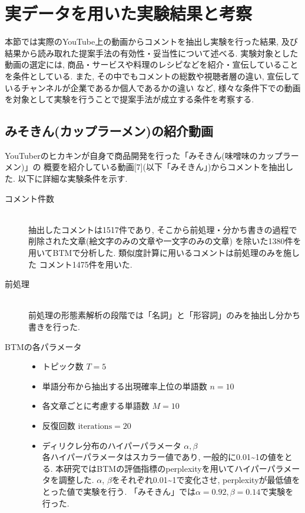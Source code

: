 \documentclass{ltjarticle}
\begin{document}
\section
{実データを用いた実験結果と考察}
本節では実際のYouTube上の動画からコメントを抽出し実験を行った結果, 及び結果から読み取れた提案手法の有効性・妥当性について述べる. 
実験対象とした動画の選定には, 商品・サービスや料理のレシピなどを紹介・宣伝していることを条件としている. 
また, その中でもコメントの総数や視聴者層の違い, 宣伝しているチャンネルが企業であるか個人であるかの違い
など, 様々な条件下での動画を対象として実験を行うことで提案手法が成立する条件を考察する. 
\subsection{みそきん(カップラーメン)の紹介動画}
YouTuberのヒカキンが自身で商品開発を行った「みそきん(味噌味のカップラーメン)」の
概要を紹介している動画[7](以下「みそきん」)からコメントを抽出した. 
以下に詳細な実験条件を示す. 
\begin{description}
    \item[コメント件数]\mbox{}\\
    抽出したコメントは1517件であり, そこから前処理・分かち書きの過程で削除された文章(絵文字のみの文章や一文字のみの文章)
    を除いた1380件を用いてBTMで分析した. 類似度計算に用いるコメントは前処理のみを施した
    コメント1475件を用いた. 
    \item[前処理] \mbox{}\\
    前処理の形態素解析の段階では「名詞」と「形容詞」のみを抽出し分かち書きを行った. 
    \item[BTMの各パラメータ]\mbox{}
    \begin{itemize}
        \item トピック数 $T=5$
        \item 単語分布から抽出する出現確率上位の単語数 $n = 10$
        \item 各文章ごとに考慮する単語数 $M=10$
        \item 反復回数 $\textrm{iterations} = 20$
        \item ディリクレ分布のハイパーパラメータ $\alpha, \beta$\\
        各ハイパーパラメータはスカラー値であり, 一般的に0.01\sim1の値をとる. 
        本研究ではBTMの評価指標のperplexityを用いてハイパーパラメータを調整した. 
        $\alpha$, $\beta$をそれぞれ0.01\sim1で変化させ, perplexityが最低値をとった値で実験を行う. 
        「みそきん」では$\alpha = 0.92, \beta = 0.14$で実験を行った. 
    \end{itemize}
\end{description}
\end{document}
